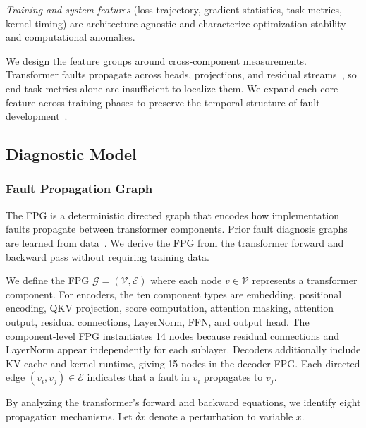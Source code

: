 \emph{Training and system features} (loss trajectory, gradient statistics, task metrics, kernel timing) are architecture-agnostic and characterize optimization stability and computational anomalies.


We design the feature groups around cross-component measurements. Transformer faults propagate across heads, projections, and residual streams~\cite{hessian_analysis,roquet2024cross}, so end-task metrics alone are insufficient to localize them. We expand each core feature across training phases to preserve the temporal structure of fault development~\cite{frankenformer}.

\subsection{Diagnostic Model}
\label{sec:defaultpp_reasoning}

\subsubsection{Fault Propagation Graph}
\label{sec:defaultpp_fpg}

The FPG is a deterministic directed graph that encodes how implementation faults propagate between transformer components. Prior fault diagnosis graphs are learned from data~\cite{fl4deep}. We derive the FPG from the transformer forward and backward pass without requiring training data.

We define the FPG $\mathcal{G} = (\mathcal{V}, \mathcal{E})$ where each node $v \in \mathcal{V}$ represents a transformer component. For encoders, the ten component types are embedding, positional encoding, QKV projection, score computation, attention masking, attention output, residual connections, LayerNorm, FFN, and output head. The component-level FPG instantiates 14 nodes because residual connections and LayerNorm appear independently for each sublayer. Decoders additionally include KV cache and kernel runtime, giving 15 nodes in the decoder FPG. Each directed edge $(v_i, v_j) \in \mathcal{E}$ indicates that a fault in $v_i$ propagates to $v_j$.

By analyzing the transformer's forward and backward equations, we identify eight propagation mechanisms. Let $\delta x$ denote a perturbation to variable $x$.

